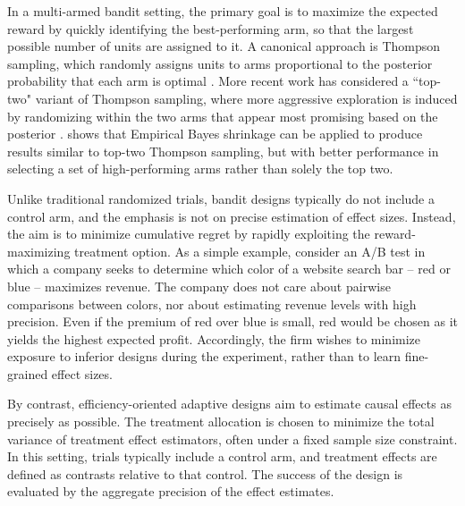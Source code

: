 \documentclass{article}
\begin{document}

In a multi-armed bandit setting, the primary goal is to maximize the expected reward by quickly identifying the best-performing arm, so that the largest possible number of units are assigned to it.  A canonical approach is Thompson sampling, which randomly assigns units to arms proportional to the posterior probability that each arm is optimal \citep{Thompson1933, AgrawalGoyal2012, Russo2018}. More recent work has considered a ``top-two" variant of Thompson sampling, where more aggressive exploration is induced by randomizing within the two arms that appear most promising based on the posterior \citep{russo2016simple, kasy2021adaptive, rosenzweig2022conversations}. \citet{dimmery2019shrinkage} shows that Empirical Bayes shrinkage can be applied to produce results similar to top-two Thompson sampling, but with better performance in selecting a set of high-performing arms rather than solely the top two.

Unlike traditional randomized trials, bandit designs typically do not include a control arm, and the emphasis is not on precise estimation of effect sizes. Instead, the aim is to minimize cumulative regret by rapidly exploiting the reward-maximizing treatment option. As a simple example, consider an A/B test in which a company seeks to determine which color of a website search bar -- red or blue -- maximizes revenue. The company does not care about pairwise comparisons between colors, nor about estimating revenue levels with high precision. Even if the %
premium of red over blue is small, red would be chosen as it yields the highest expected profit. Accordingly, the firm wishes to minimize exposure to inferior designs during the experiment, rather than to learn fine-grained effect sizes.

By contrast, efficiency-oriented adaptive designs aim to estimate causal effects as precisely as possible. The treatment allocation is chosen to minimize the total variance of treatment effect estimators, often under a fixed sample size constraint. In this setting, trials typically include a control arm, and treatment effects are defined as contrasts relative to that control. The success of the design is evaluated by the aggregate precision of the effect estimates. 
\end{document}
